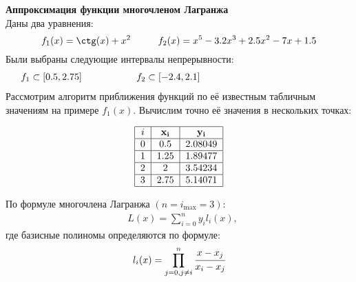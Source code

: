 \documentclass[a4paper, 14pt]{article}
\begin{document}



\newpage
{}
\setcounter{page}{2}
{\huge{\textbf{Аппроксимация функции многочленом Лагранжа}}}\\
\LARGE
Даны два уравнения:
\[f_1(x)=\ctg(x) + x^2 \hspace*{1cm} f_2(x) = x^5 - 3.2x^3 + 2.5x^2 - 7x + 1.5\]
Были выбраны следующие интервалы непрерывности:
\begin{align}
    f_1\subset[0.5, 2.75] \hspace*{2cm}f_2\subset[-2.4, 2.1]\hspace*{5cm}
\end{align}
Рассмотрим алгоритм приближения функций по её известным табличным значениям на примере $f_1(x)$. Вычислим точно её значения в нескольких точках:

\begin{center}
    \begin{align}
        \begin{tabular}{|c|c|c|}
            \hline
            $i$ & $\mathbf{x_i}$ & $\mathbf{y_i}$ \\
            \hline
            0 & 0.5 & 2.08049 \\
            \hline
            1 & 1.25 & 1.89477 \\
            \hline
            2 & 2 & 3.54234 \\
            \hline
            3 & 2.75 & 5.14071 \\
            \hline
        \end{tabular}
    \end{align}
\end{center}
По формуле многочлена Лагранжа $(n=i_{\max} = 3)$:
\begin{align}
   & L(x)=\sum_{i=0}^{n}y_il_i(x),
\end{align}
где базисные полиномы определяются по формуле:
\begin{align}
    l_i(x)=\prod_{j=0,j\ne i}^{n}\cfrac{x-x_j}{x_i-x_j}
\end{align}

\end{document}
